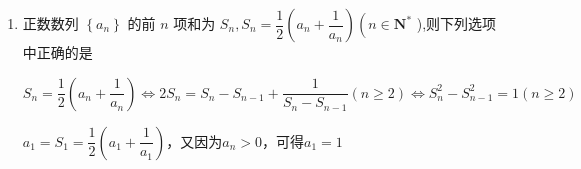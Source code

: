 \begin{enumerate}
    以上命题中正确的命题是(写出所有正确命题的序号).
    \begin{jieda}
        $\left\{\begin{array}{l}
             a_{n+1} = 2S_n \\
             a_n = 2S_{n-1} 
        \end{array}\right.$，两式相减可得$a_{n+1} = 3a_n (n \geq 2)$，$a_1 = 1, a_2 = 2S_1 = 2a_1 = 2$，$a_n = \left\{\begin{array}{ll}
             1, & n = 1 \\
             2\times 3^{n-2}, & n \geq 2
        \end{array}\right.$故错误

        $S_n = 3^{n-1}$，故正确

        $\dfrac{1}{{a}_{1}} + \dfrac{1}{{a}_{2}} + \cdots  + \dfrac{1}{{a}_{n}} = 1 + \dfrac{1}{2}\left(\dfrac{1}{1} + \dfrac{1}{3} + \dfrac{1}{9} + \cdots + \dfrac{1}{3^{n-2}}\right) = 4 - \dfrac{1}{3^{n-2}}$，故正确

        代入$a_1 = S_1 = 1$，可得$\gamma \leq \dfrac{5}{2}$故错误
    \end{jieda}
    
    \item 正数数列 $\left\{  {a}_{n}\right\}$ 的前 $n$ 项和为 ${S}_{n},{S}_{n} = \dfrac{1}{2}\left( {{a}_{n} + \dfrac{1}{{a}_{n}}}\right) \left( {n \in  {\mathbf{N}}^{ * }}\right.$ ),则下列选项中正确的是
    \begin{jieda}
        ${S}_{n} = \dfrac{1}{2}\left( {{a}_{n} + \dfrac{1}{{a}_{n}}}\right) \Longleftrightarrow 2S_n = S_n - S_{n-1} + \dfrac{1}{S_n - S_{n-1}} (n \geq 2) \Longleftrightarrow S_n^2 - S_{n-1}^2 = 1 (n \geq 2)$

        $a_1 = S_1 = \dfrac{1}{2}\left( {{a}_1 + \dfrac{1}{{a}_1}}\right)$，又因为$a_n > 0$，可得$a_1 = 1$


\end{jieda}
\end{enumerate}
